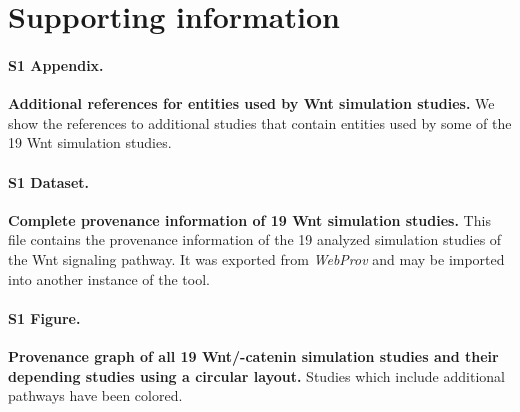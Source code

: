 \documentclass[10pt,letterpaper]{article}
\newcommand{\webprov}{\textit{WebProv}}
\newcommand{\bcat}{\textbeta-catenin}
\newcommand{\wnt}{Wnt}
\begin{document}


\section*{Supporting information}


\paragraph*{S1 Appendix.}\label{S1_AdditionalReferencesWntStudies}
{\bf Additional references for entities used by \wnt{} simulation studies.} We show the references to additional studies that contain entities used by some of the 19 \wnt{} simulation studies.

\paragraph*{S1 Dataset.}\label{S1_Provenanceinforamtion}
{\bf Complete provenance information of 19 \wnt{} simulation studies.} This file contains the provenance information of the 19 analyzed simulation studies of the \wnt{} signaling pathway. It was exported from \webprov{} and may be imported into another instance of the tool.

\paragraph*{S1 Figure.}\label{S1_FigClusters}
{\bf Provenance graph of all 19 \wnt{}/\bcat{} simulation studies and their depending studies using a circular layout.} Studies which include additional pathways have been colored.


\end{document}
